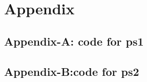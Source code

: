 \documentclass[a4paper,12pt]{article}
\begin{document}
	
	
	\newpage
	\section{Appendix}
	\subsection{Appendix-A: code for ps1}
	
	\newpage
	\subsection{Appendix-B:code for ps2}
	
	\newpage
	

	\nocite{*}
	
	
\end{document}
